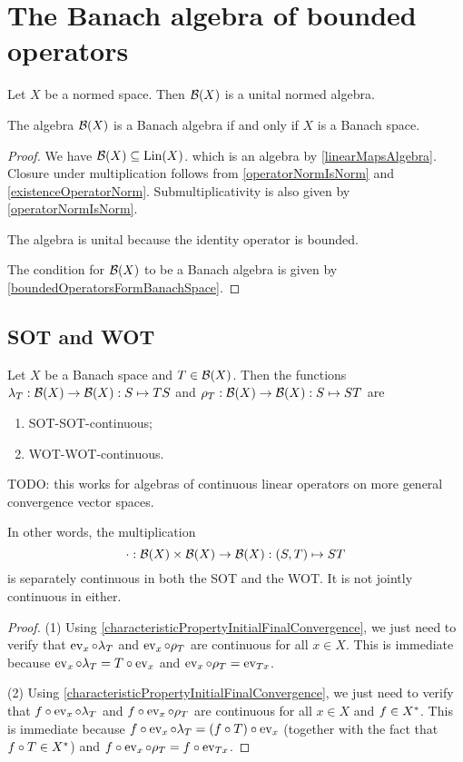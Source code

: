 \section{The Banach algebra of bounded operators}
\begin{proposition}
Let $X$ be a normed space. Then $\operatorname{\mathcal{B}}(X)$ is a unital normed algebra.

The algebra $\operatorname{\mathcal{B}}(X)$ is a Banach algebra \textup{if and only if} $X$ is a Banach space.
\end{proposition}
\begin{proof}
We have $\operatorname{\mathcal{B}}(X)\subseteq \operatorname{Lin}(X)$. which is an algebra by \ref{linearMapsAlgebra}. Closure under multiplication follows from \ref{operatorNormIsNorm} and \ref{existenceOperatorNorm}. Submultiplicativity is also given by \ref{operatorNormIsNorm}.

The algebra is unital because the identity operator is bounded.

The condition for $\operatorname{\mathcal{B}}(X)$ to be a Banach algebra is given by \ref{boundedOperatorsFormBanachSpace}.
\end{proof}

\subsection{SOT and WOT}

\begin{proposition} \label{multiplicationSeparatelySOTWOTcontinuous}
Let $X$ be a Banach space and $T\in \operatorname{\mathcal{B}}(X)$. Then the functions $\lambda_T: \operatorname{\mathcal{B}}(X)\to \operatorname{\mathcal{B}}(X): S\mapsto TS$ and $\rho_T: \operatorname{\mathcal{B}}(X)\to \operatorname{\mathcal{B}}(X): S\mapsto ST$ are
\begin{enumerate}
\item SOT-SOT-continuous;
\item WOT-WOT-continuous.
\end{enumerate}
\end{proposition}
TODO: this works for algebras of continuous linear operators on more general convergence vector spaces.

In other words, the multiplication
\[ \cdot: \operatorname{\mathcal{B}}(X)\times \operatorname{\mathcal{B}}(X) \to \operatorname{\mathcal{B}}(X): (S,T) \mapsto ST \]
is separately continuous in both the SOT and the WOT. It is not jointly continuous in either.
\begin{proof}
(1) Using \ref{characteristicPropertyInitialFinalConvergence}, we just need to verify that $\operatorname{ev}_x\circ \lambda_T$ and $\operatorname{ev}_x\circ \rho_T$ are continuous for all $x\in X$. This is immediate because $\operatorname{ev}_x\circ \lambda_T = T\circ \operatorname{ev}_x$ and $\operatorname{ev}_x\circ \rho_T = \operatorname{ev}_{Tx}$.

(2) Using \ref{characteristicPropertyInitialFinalConvergence}, we just need to verify that $f\circ \operatorname{ev}_x\circ \lambda_T$ and $f\circ \operatorname{ev}_x\circ \rho_T$ are continuous for all $x\in X$ and $f\in {X}^*$. This is immediate because $f\circ \operatorname{ev}_x\circ \lambda_T = (f\circ T)\circ \operatorname{ev}_x$ (together with the fact that $f\circ T \in {X}^*$) and $f\circ \operatorname{ev}_x\circ \rho_T = f\circ \operatorname{ev}_{Tx}$.
\end{proof}


